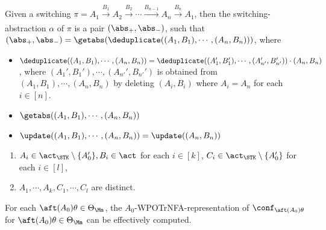 \begin{definition}
    Given a switching $\pi = A_1\xrightarrow[]{B_1}A_2\xrightarrow[]{B_2}\cdots\xrightarrow[]{B_{n-1}}A_n\xrightarrow[]{B_n}A_1$,
    then the switching-abstraction $\alpha$ of $\pi$ is a pair $(\abs_+,\abs_-)$, such that $(\abs_+,\abs_-) = \getabs(\deduplicate((A_1,B_1),\cdots,(A_n,B_n)))$, where 
    \begin{itemize}
        \item $\deduplicate((A_1,B_1),\cdots,(A_n,B_n)) = \deduplicate((A_1',B_1'),\cdots,(A_{n'}',B_{n'}'))\cdot (A_n,B_n)$, where $(A_1',B_1'),\cdots,(A_{n'}',B_{n'}')$ is obtained from $(A_1,B_1),\cdots,(A_n,B_n)$ by deleting $(A_i,B_i)$ where $A_i = A_n$ for each $i\in[n]$.
        \item $\getabs((A_1,B_1),\cdots,(A_n,B_n))$
    \end{itemize}
    \begin{itemize}
        \item $\update((A_1,B_1),\cdots,(A_n,B_n)) = \update((A_n,B_n))$
    \end{itemize}
    \begin{enumerate}
        \item $A_i\in\act_{\STK}\setminus\{A_0'\},B_i\in\act$ for each $i\in[k]$, $C_i\in\act_{\STK}\setminus\{A_0'\}$ for each $i\in[l]$,
        \item $A_1,\cdots,A_k,C_1,\cdots,C_l$ are distinct.
    \end{enumerate}
\end{definition}

\begin{theorem}
    For each $\aft(A_0)\theta\in\Theta_{\Mm}$, the $A_0$-WPOTrNFA-representation of $\conf_{\aft(A_0)\theta}$ for $\aft(A_0)\theta\in \Theta_{\Mm}$ can be effectively computed.
\end{theorem}



